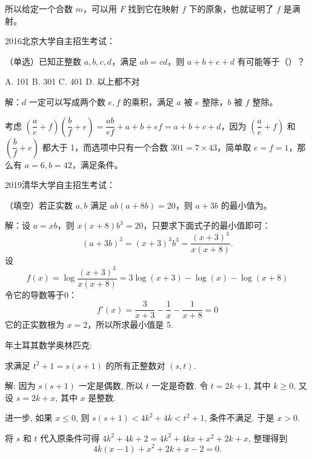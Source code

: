 所以给定一个合数 $ m $，可以用 $ F $ 找到它在映射 $ f $ 下的原象，也就证明了 $ f $ 是满射。

\newpage

2016北京大学自主招生考试：

（单选）已知正整数 $ a,b,c,d $，满足 $ ab=cd $，则 $ a+b+c+d $ 有可能等于（）？

A. 101 \hspace{4em}  B. 301 \hspace{4em}  C. 401 \hspace{4em}  D. 以上都不对

解：$ d $ 一定可以写成两个数 $ e,f $ 的乘积，满足 $ a $ 被 $ e $ 整除，$ b $ 被 $ f $ 整除。

考虑 $ (\dfrac{a}{e}+f)(\dfrac{b}{f}+e) = \dfrac{ab}{ef} + a + b + ef = a+b+c+d $，因为 $ (\dfrac{a}{e}+f) $ 和 $ (\dfrac{b}{f}+e) $ 都大于 1，而选项中只有一个合数 $ 301=7\times 43 $，简单取 $ e=f=1 $，那么有 $ a=6, b=42 $，满足条件。

\newpage

2019清华大学自主招生考试：

（填空）若正实数 $ a,b $ 满足 $ ab(a+8b) = 20 $，则 $ a + 3b $ 的最小值为\underline{\hspace{2em}}。

解：设 $ a = xb $，则 $ x(x+8)b^3=20 $，只要求下面式子的最小值即可：
\[ (a+3b)^3 = (x+3)^3b^3 = \frac{(x+3)^3}{x(x+8)} .\]
设 
\[ f(x) = \log \frac{(x+3)^3}{x(x+8)} = 3\log (x+3) - \log(x) - \log(x+8) \]
令它的导数等于0：
\[ f'(x) = \frac{3}{x+3}-\frac{1}{x}- \frac{1}{x+8} = 0\]
它的正实数根为 $ x = 2 $，所以所求最小值是 5.

\newpage


 年土耳其数学奥林匹克: 

求满足 $ t^2+1=s(s+1) $ 的所有正整数对 $ (s,t) $.

解: 因为 $ s(s+1) $ 一定是偶数, 所以 $ t $ 一定是奇数. 令 $ t = 2k + 1 $, 其中 $ k \ge 0 $, 又设 $ s = 2k + x $, 其中 $ x $ 是整数. 

进一步, 如果 $ x \le 0 $, 则 $ s(s+1) < 4k^2+4k < t^2 + 1 $, 条件不满足. 于是 $ x > 0 $.

将 $ s $ 和 $ t $ 代入原条件可得 $ 4k^2 + 4k + 2 = 4k^2 + 4kx + x^2 + 2k + x $, 整理得到 
\[ 4k(x-1)+x^2+2k+x-2=0. \] 


